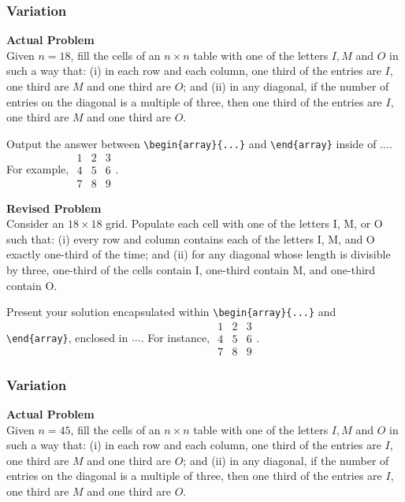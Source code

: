 \subsubsection{Variation}
\textbf{Actual Problem}\\
Given $n = 18$, fill the cells of an $n \times n$ table with one of the letters $I,M$ and $O$ in such a way that:
(i) in each row and each column, one third of the entries are $I$, one third are $M$ and one third are $O$; and
(ii) in any diagonal, if the number of entries on the diagonal is a multiple of three, then one third of the entries are $I$, one third are $M$ and one third are $O$.

Output the answer between \verb|\begin{array}{...}| and \verb|\end{array}| inside of $\boxed{...}$. For example, $\boxed{\begin{array}{ccc}1 & 2 & 3 \\ 4 & 5 & 6 \\ 7 & 8 & 9\end{array}}$.

\textbf{Revised Problem}\\
Consider an $18 \times 18$ grid. Populate each cell with one of the letters I, M, or O such that: 
(i) every row and column contains each of the letters I, M, and O exactly one-third of the time; and 
(ii) for any diagonal whose length is divisible by three, one-third of the cells contain I, one-third contain M, and one-third contain O.

Present your solution encapsulated within \verb|\begin{array}{...}| and \verb|\end{array}|, enclosed in $\boxed{...}$. For instance, $\boxed{\begin{array}{ccc}1 & 2 & 3 \\ 4 & 5 & 6 \\ 7 & 8 & 9\end{array}}$.

\subsubsection{Variation}
\textbf{Actual Problem}\\
Given $n = 45$, fill the cells of an $n \times n$ table with one of the letters $I,M$ and $O$ in such a way that:
(i) in each row and each column, one third of the entries are $I$, one third are $M$ and one third are $O$; and
(ii) in any diagonal, if the number of entries on the diagonal is a multiple of three, then one third of the entries are $I$, one third are $M$ and one third are $O$.

